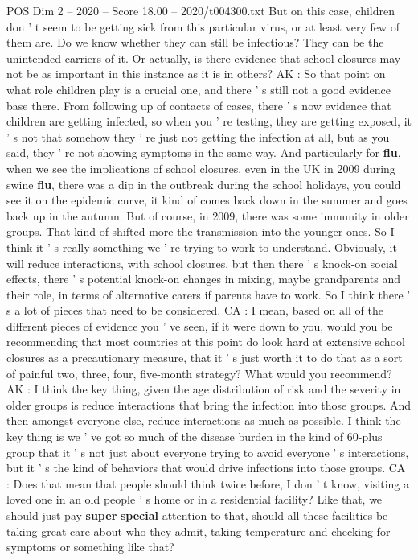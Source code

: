 \begin{textsample}{POS Dim 2 – 2020 – Score 18.00 – 2020/t004300.txt}
But on this case, children don ' t seem to be getting sick from this particular virus, or at least very few of them are.
Do we know whether they can still be infectious?
They can be the unintended carriers of it.
Or actually, is there evidence that school closures may not be as important in this instance as it is in others?
AK : So that point on what role children play is a crucial one, and there ' s still not a good evidence base there.
From following up of contacts of cases, there ' s now evidence that children are getting infected, so when you ' re testing, they are getting exposed, it ' s not that somehow they ' re just not getting the infection at all, but as you said, they ' re not showing symptoms in the same way.
And particularly for \textbf{flu}, when we see the implications of school closures, even in the UK in 2009 during swine \textbf{flu}, there was a dip in the outbreak during the school holidays, you could see it on the epidemic curve, it kind of comes back down in the summer and goes back up in the autumn.
But of course, in 2009, there was some immunity in older groups.
That kind of shifted more the transmission into the younger ones.
So I think it ' s really something we ' re trying to work to understand.
Obviously, it will reduce interactions, with school closures, but then there ' s knock-on social effects, there ' s potential knock-on changes in mixing, maybe grandparents and their role, in terms of alternative carers if parents have to work.
So I think there ' s a lot of pieces that need to be considered.
CA : I mean, based on all of the different pieces of evidence you ' ve seen, if it were down to you, would you be recommending that most countries at this point do look hard at extensive school closures as a precautionary measure, that it ' s just worth it to do that as a sort of painful two, three, four, five-month strategy?
What would you recommend?
AK : I think the key thing, given the age distribution of risk and the severity in older groups is reduce interactions that bring the infection into those groups.
And then amongst everyone else, reduce interactions as much as possible.
I think the key thing is we ' ve got so much of the disease burden in the kind of 60-plus group that it ' s not just about everyone trying to avoid everyone ' s interactions, but it ' s the kind of behaviors that would drive infections into those groups.
CA : Does that mean that people should think twice before, I don ' t know, visiting a loved one in an old people ' s home or in a residential facility?
Like that, we should just pay \textbf{super} \textbf{special} attention to that, should all these facilities be taking great care about who they admit, taking temperature and checking for symptoms or something like that?

\end{textsample}
